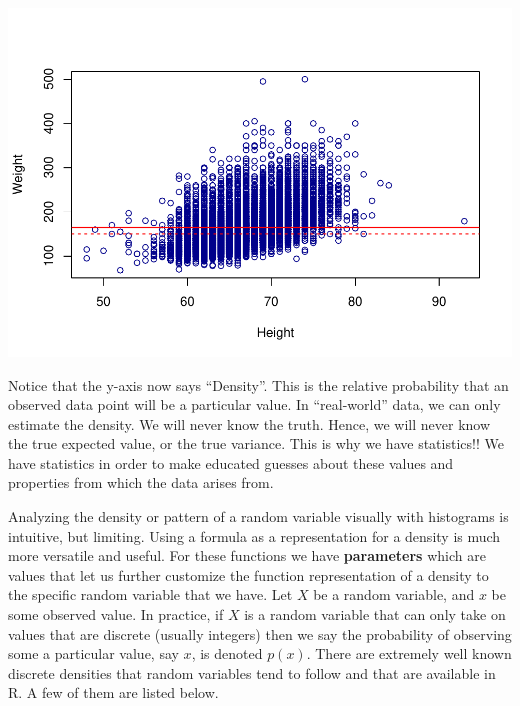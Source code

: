 \documentclass[
]{book}
\newenvironment{Shaded}{\begin{snugshade}}{\end{snugshade}}
\newcommand{\DataTypeTok}[1]{\textcolor[rgb]{0.13,0.29,0.53}{#1}}
\newcommand{\DecValTok}[1]{\textcolor[rgb]{0.00,0.00,0.81}{#1}}
\newcommand{\FloatTok}[1]{\textcolor[rgb]{0.00,0.00,0.81}{#1}}
\newcommand{\KeywordTok}[1]{\textcolor[rgb]{0.13,0.29,0.53}{\textbf{#1}}}
\newcommand{\NormalTok}[1]{#1}
\newcommand{\OperatorTok}[1]{\textcolor[rgb]{0.81,0.36,0.00}{\textbf{#1}}}
\newcommand{\OtherTok}[1]{\textcolor[rgb]{0.56,0.35,0.01}{#1}}
\newcommand{\StringTok}[1]{\textcolor[rgb]{0.31,0.60,0.02}{#1}}
\begin{document}
\begin{Shaded}
\end{Shaded}

\includegraphics{_main_files/figure-latex/unnamed-chunk-213-1.pdf}

Notice that the y-axis now says ``Density''. This is the relative probability that an observed data point will be a particular value. In ``real-world'' data, we can only estimate the density. We will never know the truth. Hence, we will never know the true expected value, or the true variance. This is why we have statistics!! We have statistics in order to make educated guesses about these values and properties from which the data arises from.

Analyzing the density or pattern of a random variable visually with histograms is intuitive, but limiting. Using a formula as a representation for a density is much more versatile and useful. For these functions we have \textbf{parameters} which are values that let us further customize the function representation of a density to the specific random variable that we have. Let \(X\) be a random variable, and \(x\) be some observed value. In practice, if \(X\) is a random variable that can only take on values that are discrete (usually integers) then we say the probability of observing some a particular value, say \(x\), is denoted \(p(x)\). There are extremely well known discrete densities that random variables tend to follow and that are available in R. A few of them are listed below.
\end{document}

